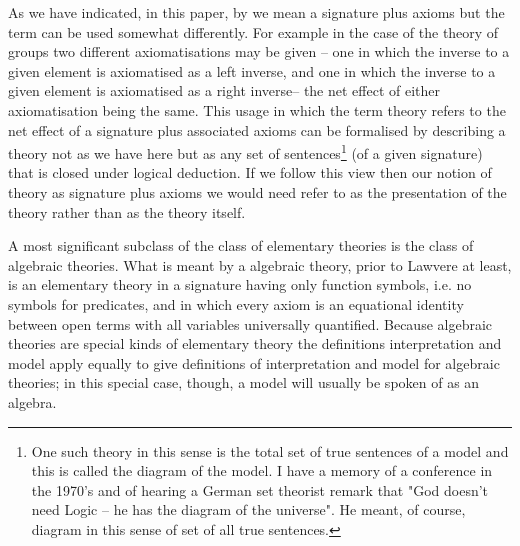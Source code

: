 \note 
As we have indicated, in this paper, by  we mean a signature plus axioms but 
the term can be used somewhat differently. 
For example in the case of the theory of groups two different axiomatisations may be given 
-- one in which the inverse to a given element is axiomatised as a left inverse, and one in which the inverse to a given element is axiomatised as a right inverse--
the net effect of either axiomatisation being the same.
This usage in which  the term theory refers to the net effect of a signature plus associated axioms
can be formalised by describing a 
theory not as we have here but as any set of sentences\footnote{One such theory in this sense is the total set of true sentences of a model and  
this is called the diagram of the model. I have a  memory of a conference in the 1970's and of hearing a German set theorist
 remark that "God doesn't need Logic -- he has the diagram of the universe". He meant, of course, diagram in this sense of set of all true sentences.}
 (of a given signature) that is closed under logical deduction. 
If we follow this view then our notion of theory as  signature plus axioms we would need refer to as the presentation of the theory rather than as the theory itself.

\note
A most significant subclass of the class of elementary theories is the class of algebraic theories. 
What is meant by a algebraic theory, prior to Lawvere at least, is an elementary theory in a signature having only function symbols, i.e. no symbols for predicates, 
and in which every axiom is an equational identity between open terms with all variables universally quantified. 
Because algebraic theories are special kinds of elementary theory the definitions interpretation and model apply equally to give definitions of 
interpretation and model for algebraic theories; in this special case, though, a model will usually be spoken of as an algebra.

